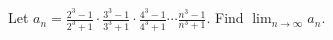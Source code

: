 Let $a_n = \frac{2^3-1}{2^3+1} \cdot \frac{3^3-1}{3^3+1} \cdot \frac{4^3-1}{4^3+1} \cdots \frac{n^3-1}{n^3+1}$. Find $\lim_{n\to\infty} a_n$.
